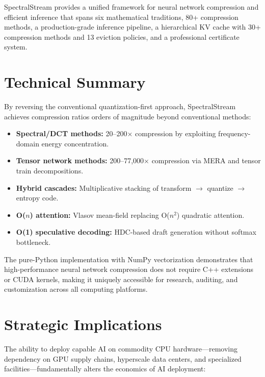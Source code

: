 \documentclass[11pt,a4paper,openright]{book}
\begin{document}
SpectralStream provides a unified framework for neural network compression and efficient inference that spans six mathematical traditions, 80+ compression methods, a production-grade inference pipeline, a hierarchical KV cache with 30+ compression methods and 13 eviction policies, and a professional certificate system.

\section{Technical Summary}

By reversing the conventional quantization-first approach, SpectralStream achieves compression ratios orders of magnitude beyond conventional methods:

\begin{itemize}
	\item \textbf{Spectral/DCT methods:} 20--200$\times$ compression by exploiting frequency-domain energy concentration.
	\item \textbf{Tensor network methods:} 200--77,000$\times$ compression via MERA and tensor train decompositions.
	\item \textbf{Hybrid cascades:} Multiplicative stacking of transform $\to$ quantize $\to$ entropy code.
	\item \textbf{O($n$) attention:} Vlasov mean-field replacing O($n^2$) quadratic attention.
	\item \textbf{O(1) speculative decoding:} HDC-based draft generation without softmax bottleneck.
\end{itemize}

The pure-Python implementation with NumPy vectorization demonstrates that high-performance neural network compression does not require C++ extensions or CUDA kernels, making it uniquely accessible for research, auditing, and customization across all computing platforms.

\section{Strategic Implications}

The ability to deploy capable AI on commodity CPU hardware---removing dependency on GPU supply chains, hyperscale data centers, and specialized facilities---fundamentally alters the economics of AI deployment:
\end{document}
